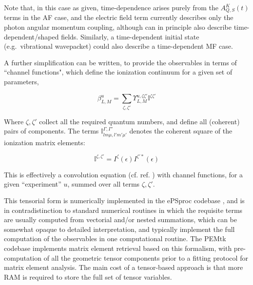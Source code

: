 Note that, in this case as given, time-dependence arises purely from the \(A_{Q,S}^{K}(t)\) terms in the AF case, and the electric field term currently describes only the photon angular momentum coupling,
although can in principle also describe time-dependent/shaped fields. Similarly, a time-dependent initial state (e.g.~vibrational wavepacket) could also describe a time-dependent MF case.



A further simplification can be written, to provide the observables in terms of ``channel functions", which define the ionization continuum for a given set of parameters,

\begin{equation}
\beta_{L,M}^{u}=\sum_{\zeta,\zeta'}\varUpsilon_{L,M}^{u,\zeta\zeta'}\mathbb{I}^{\zeta\zeta'}
\end{equation}


Where $\zeta,\zeta'$ collect all the required quantum numbers, and define all (coherent) pairs of components. The terms $\mathbb{I}_{lm\mu,l'm'\mu'}^{\Gamma,\Gamma'}$ denotes the coherent square of the ionization matrix elements:

\begin{equation}
\mathbb{I}^{\zeta,\zeta'}=I^{\zeta}(\epsilon)I^{\zeta'*}(\epsilon)
\end{equation}

This is effectively a convolution equation (cf. ref. \cite{Reid2000}) with channel functions, for
a given ``experiment'' $u$, summed over all terms $\zeta,\zeta'$.

This tensorial form is numerically implemented in the ePSproc codebase \cite{ePSprocGithub}, and is in contradistinction to standard numerical routines in which the requisite terms are usually computed from vectorial and/or nested summations, which can be somewhat opaque to detailed interpretation, and typically implement the full computation of the observables in one computational routine. The PEMtk codebase \cite{hockett2021PhotoelectronMetrologyToolkit} implements matrix element retrieval based on this formalism, with pre-computation of all the geometric tensor components prior to a fitting protocol for matrix element analysis. The main cost of a tensor-based approach is that more RAM is required to store the full set of tensor variables.

